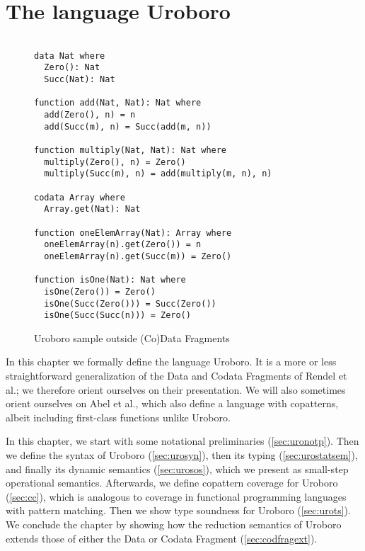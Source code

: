 \chapter{The language Uroboro}

\begin{figure}
\begin{lstlisting}

data Nat where
  Zero(): Nat
  Succ(Nat): Nat

function add(Nat, Nat): Nat where
  add(Zero(), n) = n
  add(Succ(m), n) = Succ(add(m, n))

function multiply(Nat, Nat): Nat where
  multiply(Zero(), n) = Zero()
  multiply(Succ(m), n) = add(multiply(m, n), n)

codata Array where
  Array.get(Nat): Nat

function oneElemArray(Nat): Array where
  oneElemArray(n).get(Zero()) = n
  oneElemArray(n).get(Succ(m)) = Zero()

function isOne(Nat): Nat where
  isOne(Zero()) = Zero()
  isOne(Succ(Zero())) = Succ(Zero())
  isOne(Succ(Succ(n))) = Zero()

\end{lstlisting}
\caption{Uroboro sample outside (Co)Data Fragments}
\label{fig:ch2uroex}
\end{figure}

In this chapter we formally define the language Uroboro. It is a more or less straightforward generalization of the Data and Codata Fragments of Rendel et al.\cite{rendel15automatic}; we therefore orient ourselves on their presentation. We will also sometimes orient ourselves on Abel et al.\cite{abel13copatterns}, which also define a language with copatterns, albeit including first-class functions unlike Uroboro.

In this chapter, we start with some notational preliminaries (\autoref{sec:uronotp}). Then we define the syntax of Uroboro (\autoref{sec:urosyn}), then its typing (\autoref{sec:urostatsem}), and finally its dynamic semantics (\autoref{sec:urosos}), which we present as small-step operational semantics. Afterwards, we define copattern coverage for Uroboro (\autoref{sec:cc}), which is analogous to coverage in functional programming languages with pattern matching. Then we show type soundness for Uroboro (\autoref{sec:urots}). We conclude the chapter by showing how the reduction semantics of Uroboro extends those of either the Data or Codata Fragment (\autoref{sec:codfragext}).

